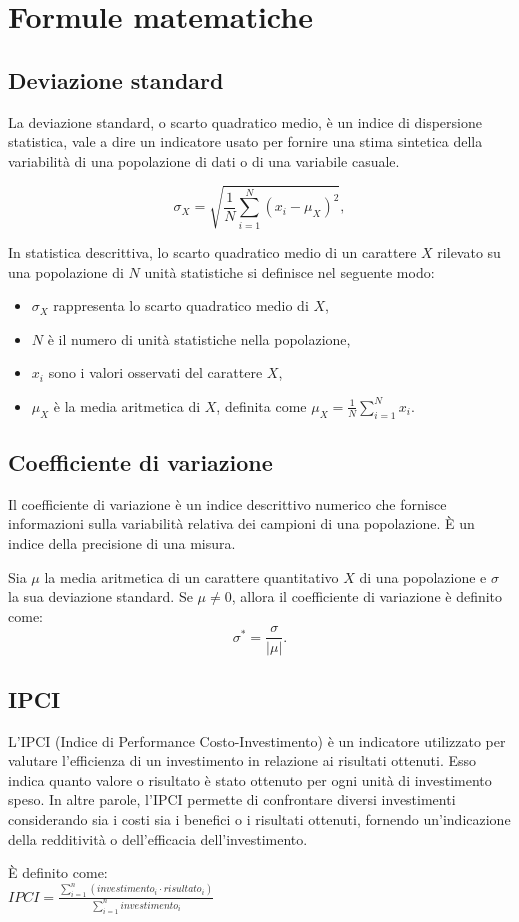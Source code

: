 \chapter{Formule matematiche}

\section*{Deviazione standard}
\label{appendice:ds}
La deviazione standard, o scarto quadratico medio, è un indice di dispersione statistica, vale a dire un indicatore usato per fornire una stima sintetica della variabilità di una popolazione di dati o di una variabile casuale. 

\[ \sigma_X = \sqrt{\frac{1}{N} \sum_{i=1}^{N} (x_i - \mu_X)^2}, \]

In statistica descrittiva, lo scarto quadratico medio di un carattere \( X \) rilevato su una popolazione di \( N \) unità statistiche si definisce nel seguente modo:
\begin{itemize}
    \item \(\sigma_X\) rappresenta lo scarto quadratico medio di \(X\),
    \item \(N\) è il numero di unità statistiche nella popolazione,
    \item \(x_i\) sono i valori osservati del carattere \(X\),
    \item \(\mu_X\) è la media aritmetica di \(X\), definita come \(\mu_X = \frac{1}{N} \sum_{i=1}^{N} x_i\).
\end{itemize}

\section*{Coefficiente di variazione}
\label{appendice:cv}
Il coefficiente di variazione è un indice descrittivo numerico che fornisce informazioni sulla variabilità relativa dei campioni di una popolazione. È un indice della precisione di una misura. 

Sia \( \mu \) la media aritmetica di un carattere quantitativo \( X \) di una popolazione e \( \sigma \) la sua deviazione standard. Se \( \mu \neq 0 \), allora il coefficiente di variazione è definito come:
\[ \sigma^* = \frac{\sigma}{|\mu|}. \]

\section*{IPCI}
\label{appendice:ipci}
L'IPCI (Indice di Performance Costo-Investimento) è un indicatore utilizzato per valutare l'efficienza di un investimento in relazione ai risultati ottenuti. Esso indica quanto valore o risultato è stato ottenuto per ogni unità di investimento speso. In altre parole, l'IPCI permette di confrontare diversi investimenti considerando sia i costi sia i benefici o i risultati ottenuti, fornendo un'indicazione della redditività o dell'efficacia dell'investimento.

È definito come: 
\\[2ex]
$IPCI = \frac{\sum_{i=1}^{n} (investimento_i \cdot risultato_i)}{\sum_{i=1}^{n} investimento_i}$







